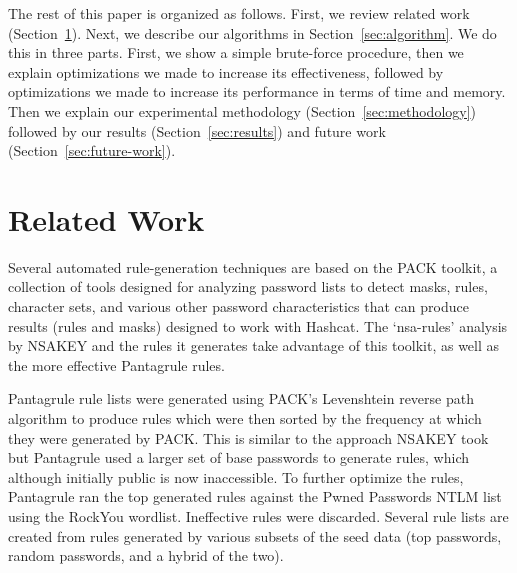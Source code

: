 \documentclass{article}
\begin{document}
The rest of this paper is organized as follows. First, we review related work
(Section~\ref{sec:related-work}). Next, we describe our algorithms in
Section~\ref{sec:algorithm}. We do this in three parts. First, we show a
simple brute-force procedure, then we explain optimizations we made to increase
its effectiveness, followed by optimizations we made to increase its
performance in terms of time and memory. Then we explain our experimental
methodology (Section~\ref{sec:methodology}) followed by our results
(Section~\ref{sec:results}) and future work (Section~\ref{sec:future-work}).




\section{Related Work}
\label{sec:related-work}

Several automated rule-generation techniques are based
on the PACK toolkit\autocite{PACK}, a collection of tools designed for analyzing
password lists to detect masks, rules, character sets, and various other
password characteristics that can produce results (rules and masks) designed to
work with Hashcat. The `nsa-rules' analysis by NSAKEY\autocite{NSAKEY} and the
rules it generates take advantage of this toolkit, as well as the more
effective Pantagrule rules\autocite{pantagrule}.

Pantagrule rule lists were generated using PACK's Levenshtein reverse path
algorithm to produce rules which were then sorted by the frequency at which
they were generated by PACK. This is similar to the approach NSAKEY took but
Pantagrule used a larger set of base passwords to generate rules, which
although initially public is now inaccessible. To further optimize the rules,
Pantagrule ran the top generated rules against the Pwned Passwords NTLM
list\autocite{pwned} using the RockYou wordlist. Ineffective rules were discarded.
Several rule lists are created from rules generated by various subsets of the
seed data (top passwords, random passwords, and a hybrid of the two).
\end{document}
